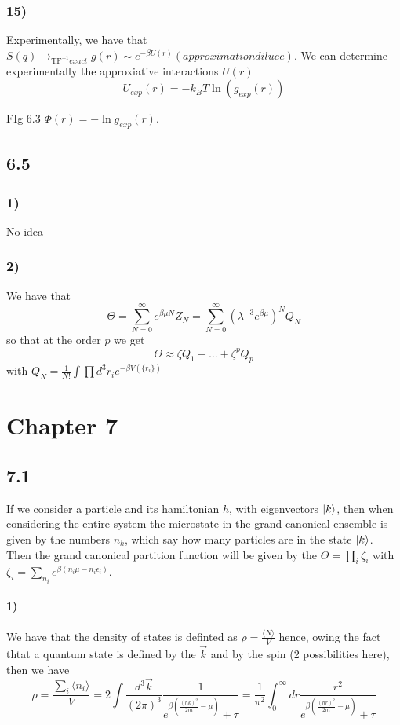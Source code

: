 \documentclass[10pt,a4paper]{book}
\newcommand{\tf}{\text{TF}}
\begin{document}
\subsection*{15)}

Experimentally, we have that $S(q)\to_{\tf^{-1}exact }g(r)\sim e^{-\beta U(r)}(approximation diluee)$. We can determine experimentally the approxiative interactions $U(r)$
$$U_{exp}(r)=-k_BT\ln(g_{exp}(r))$$

FIg 6.3 $\Phi(r)=-\ln g_{exp}(r)$. 


\section*{6.5}

\subsection*{1)}
No idea

\subsection*{2)}

We have that
$$\Theta=\sum_{N=0}^{\infty}e^{\beta \mu N}Z_N=\sum_{N=0}^{\infty}(\lambda^{-3}e^{\beta\mu})^NQ_N$$
so that at the order $p$ we get
$$\Theta\approx \zeta Q_1+\ldots+\zeta^{p}Q_p$$
with $Q_N=\frac{1}{N!}\int\prod d^3{r}_i e^{-\beta V(\{r_i\})}$


\chapter*{Chapter 7}

\section*{7.1}
If we consider a particle and its hamiltonian $h$, with eigenvectors $\ket{k}$, then when considering the entire system the microstate in the grand-canonical ensemble is given by the numbers $n_k$, which say how many particles are in the state $\ket{k}$. Then the grand canonical partition function will be given by the $\Theta=\prod_i\zeta_i$ with $\zeta_i=\sum_{n_i} e^{\beta(n_i\mu-n_i\epsilon_i)}$.

\subsubsection*{1)}

We have that the density of states is definted as $\rho=\frac{\langle N\rangle}{V}$
hence, owing the fact thtat a quantum state is defined by the $\vec{k}$ and by the spin (2 possibilities here), then we have
$$\rho=\frac{\sum_i\langle n_i\rangle}{V}=2\int\frac{d^3\vec{k}}{(2\pi)^3}\frac{1}{e^{\beta(\frac{(\hbar k)^2}{2m}-\mu)}+\tau}=\frac{1}{\pi^2}\int_0^{\infty} dr\frac{r^2}{e^{\beta(\frac{(\hbar r)^2}{2m}-\mu)}+\tau}$$
\end{document}
